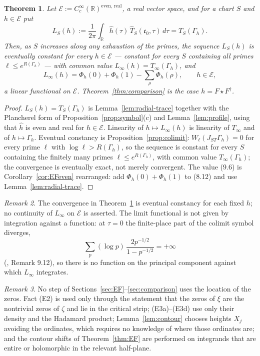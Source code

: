 \documentclass[11pt]{amsart}
\newtheorem{theorem}{Theorem}[section]
\theoremstyle{definition}
\theoremstyle{remark}
\newtheorem{remark}[theorem]{Remark}
\newcommand{\R}{\mathbb R}
\newcommand{\cz}{\mathfrak c_0}
\begin{document}
\begin{theorem}
\label{thm:limitsymbols}
Let $\mathcal E:=C_c^\infty(\R)^{\mathrm{even},\,\mathrm{real}}$, a real vector
space, and for a chart $S$ and $h\in\mathcal E$ put
\[
  L_S(h):=\frac1{2\pi}\int_\R\hat h(\tau)\,\widehat T_S(\cz,\tau)\,d\tau
  =T_S(\Gamma_h).
\]
Then, as $S$ increases along any exhaustion of the primes, the sequence
$L_S(h)$ is \emph{eventually constant} for every $h\in\mathcal E$ --- constant
for every $S$ containing all primes $\ell\le e^{R(\Gamma_h)}$ --- with common
value $L_\infty(h)=T_\infty(\Gamma_h)$, and
\begin{equation}
  L_\infty(h)=\Phi_h(0)+\Phi_h(1)-\sum_\rho\Phi_h(\rho),
  \qquad h\in\mathcal E ,
\tag{9.6}
\end{equation}
a linear functional on $\mathcal E$.  Theorem~\emph{\ref{thm:comparison}} is
the case $h=F\star F^\dagger$.
\end{theorem}

\begin{proof}
$L_S(h)=T_S(\Gamma_h)$ is Lemma~\ref{lem:radial-trace} together with the
Plancherel form of Proposition~\ref{prop:symbol}(c) and
Lemma~\ref{lem:profile}, using that $\hat h$ is even and real for
$h\in\mathcal E$.  Linearity of $h\mapsto L_\infty(h)$ is linearity of
$T_\infty$ and of $h\mapsto\Gamma_h$.  Eventual constancy is
Proposition~\ref{prop:colimit}: $W_\ell(J_{ST}\Gamma_h)=0$ for every prime
$\ell$ with $\log\ell>R(\Gamma_h)$, so the sequence is constant for every $S$
containing the finitely many primes $\ell\le e^{R(\Gamma_h)}$, with common
value $T_\infty(\Gamma_h)$; the convergence is eventually exact, not merely
convergent.  The value (9.6) is Corollary~\ref{cor:EFeven} rearranged: add
$\Phi_h(0)+\Phi_h(1)$ to (8.12) and use Lemma~\ref{lem:radial-trace}.
\end{proof}

\begin{remark}
\label{rem:notafunction}
The convergence in Theorem~\ref{thm:limitsymbols} is eventual constancy for
each fixed $h$; no continuity of $L_\infty$ on $\mathcal E$ is asserted.  The
limit functional is not given by integration against a function: at $\tau=0$ the finite-place part of the colimit symbol
diverges,
\[
  \sum_p(\log p)\,\frac{2p^{-1/2}}{1-p^{-1/2}}=+\infty
\]
(\cite{P44}, Remark 9.12), so there is no function on the principal
component against which $L_\infty$ integrates.
\end{remark}

\begin{remark}
\label{rem:noposition}
No step of Sections~\ref{sec:EF}--\ref{sec:comparison} uses the location of
the zeros.  Fact (E2) is used only through the statement that the zeros of $\xi$ are
the nontrivial zeros of $\zeta$ and lie in the critical strip; (E3a)--(E3d) use
only their density and the Hadamard product; Lemma~\ref{lem:contour} chooses
heights $X_j$ avoiding the ordinates, which requires no knowledge of where
those ordinates are; and the contour shifts of Theorem~\ref{thm:EF} are
performed on integrands that are entire or holomorphic in the relevant
half-plane.
\end{remark}
\end{document}
